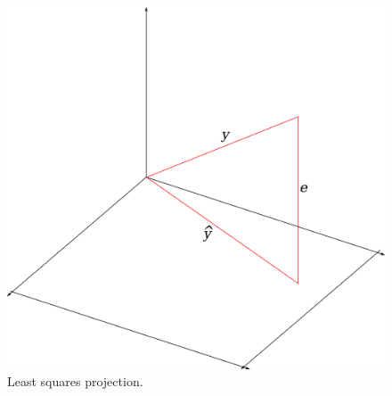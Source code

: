\documentclass[lecture,12pt,]{pcms-l}
\theoremstyle{example}
\begin{document}
\begin{figure}[ht!]
  \centering
  \includegraphics[width=.4x\textwidth]{images/07ls}
  \caption{Least squares projection.}
  \label{fig:07ls}
\end{figure}
\end{document}
